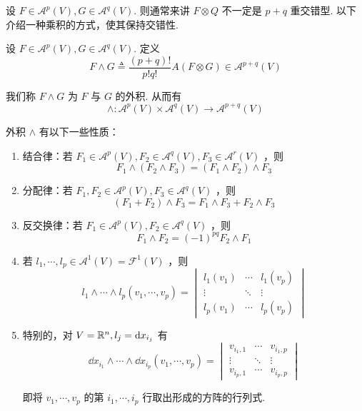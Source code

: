 
设 $F\in\mathscr{A}^p(V),G\in\mathscr{A}^q(V)$. 则通常来讲 $F\otimes Q$ 不一定是 $p+q$ 重交错型. 以下介绍一种乘积的方式，使其保持交错性.

\begin{definition}
    设 $F\in\mathscr{A}^p(V),G\in\mathscr{A}^q(V)$. 定义
$$
F\wedge G\triangleq\frac{(p+q)!}{p!q!}A(F\otimes G)\in\mathscr{A}^{p+q}(V)
$$
\end{definition}

我们称 $F\wedge G$ 为 $F$ 与 $G$ 的外积. 从而有
$$
\wedge:\mathscr{A}^p(V)\times\mathscr{A}^q(V)\to\mathscr{A}^{p+q}(V)
$$

外积 $\wedge$ 有以下一些性质：

\begin{property}
    \begin{enumerate}
        \item 结合律：若 $F_1\in\mathscr{A}^p(V),F_2\in\mathscr{A}^q(V),F_3\in\mathscr{A}^r(V)$ ，则
$$
F_1\wedge(F_2\wedge F_3)=(F_1\wedge F_2)\wedge F_3
$$

        \item 分配律：若 $F_1,F_2\in\mathscr{A}^p(V),F_3\in\mathscr{A}^q(V)$ ，则
$$
(F_1+F_2)\wedge F_3=F_1\wedge F_3+F_2\wedge F_3
$$

        \item 反交换律：若 $F_1\in\mathscr{A}^p(V),F_2\in\mathscr{A}^q(V)$ ，则
$$
F_1\wedge F_2=(-1)^{pq}F_2\wedge F_1
$$

        \item 若 $l_1,\cdots,l_p\in\mathscr{A}^1(V)=\mathscr{F}^1(V)$ ，则
$$
l_1\wedge\cdots\wedge l_p(v_1,\cdots,v_p)=\begin{vmatrix}
    l_1(v_1) & \cdots & l_1(v_p)\\
    \vdots & \ddots & \vdots\\
    l_p(v_1) & \cdots & l_p(v_p)
\end{vmatrix}
$$

        \item 特别的，对 $V=\mathbb{R}^n,l_j=\mathrm{d} x_{i_j}$ 有
$$
\dd x_{i_1}\wedge\cdots\wedge\dd x_{i_p}(v_1,\cdots,v_p)=\begin{vmatrix}
    v_{i_1,1} & \cdots & v_{i_1,p}\\
    \vdots & \ddots & \vdots\\
    v_{i_p,1} & \cdots & v_{i_p,p}
\end{vmatrix}
$$

        即将 $v_1,\cdots,v_p$ 的第 $i_1,\cdots,i_p$ 行取出形成的方阵的行列式.
    \end{enumerate}
\end{property}

